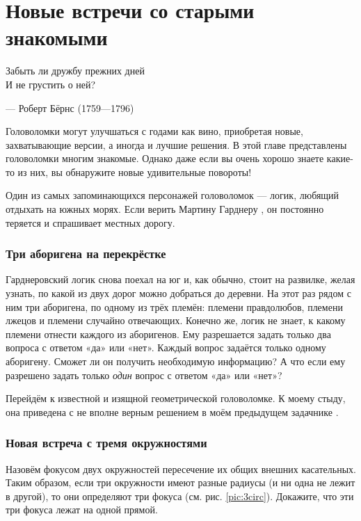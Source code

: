 \chapter{Новые встречи со старыми знакомыми}

\setlength{\epigraphwidth}{.53\textwidth}
\epigraph{Забыть ли дружбу прежних дней\\
И не грустить о ней?}{--- Роберт Бёрнс (1759---1796)}

Головоломки могут улучшаться с годами как вино, приобретая новые, захватывающие версии, а иногда и лучшие решения.
В этой главе представлены головоломки многим знакомые.
Однако даже если вы очень хорошо знаете какие-то из них, 
вы обнаружите новые удивительные повороты!

Один из самых запоминающихся персонажей головоломок --- логик, любящий отдыхать на южных морях.
Если верить Мартину Гарднеру \cite{27}, он постоянно теряется и спрашивает местных дорогу.

\subsection*{Три аборигена на перекрёстке}

Гарднеровский логик снова поехал на юг и, как обычно, стоит на развилке, желая узнать, по какой из двух дорог можно добраться до деревни.
На этот раз рядом с ним три аборигена, по одному из трёх племён:
племени правдолюбов,
племени лжецов
и племени случайно отвечающих.
Конечно же, логик не знает, к какому племени отнести каждого из аборигенов.
Ему разрешается задать только два вопроса с ответом «да» или «нет».
Каждый вопрос задаётся только одному аборигену.
Сможет ли он получить необходимую информацию?
А что если ему разрешено задать только \emph{один} вопрос с ответом «да» или «нет»?

\medskip

Перейдём к известной и изящной геометрической головоломке.
К моему стыду, она приведена с не вполне верным решением в моём предыдущем задачнике \cite{59}.

\subsection*{Новая встреча с тремя окружностями}

Назовём фокусом двух окружностей пересечение их общих внешних касательных.
Таким образом, если три окружности имеют разные радиусы (и ни одна не лежит в другой), то они определяют три фокуса (см. рис. \ref{pic:3circ}).
Докажите, что эти три фокуса лежат на одной прямой.

